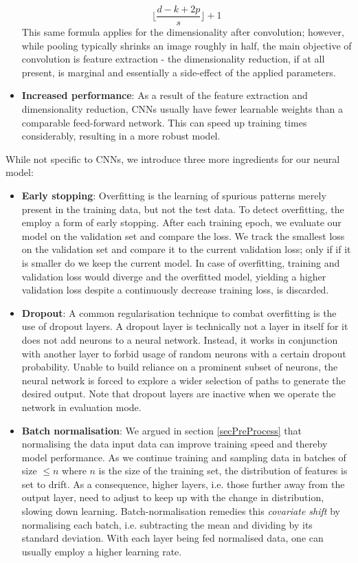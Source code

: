 \documentclass[british,12p]{article}
\begin{document}
\begin{itemize}
    	$$\big\lfloor\frac{d - k + 2p}{s}\big\rfloor + 1$$
    	This same formula applies for the dimensionality after convolution; however, while pooling typically shrinks an image roughly in half, the main objective of convolution is feature extraction - the dimensionality reduction, if at all present, is marginal and essentially a side-effect of the applied parameters. 
    	\item \textbf{Increased performance}: As a result of the feature extraction and dimensionality reduction, CNNs usually have fewer learnable weights than a comparable feed-forward network. This can speed up training times considerably, resulting in a more robust model.
    \end{itemize}
    
    While not specific to CNNs, we introduce three more ingredients for our neural model:
    \begin{itemize}
    	\item \textbf{Early stopping}: Overfitting is the learning of spurious patterns merely present in the training data, but not the test data. To detect overfitting, the employ a form of early stopping. After each training epoch, we evaluate our model on the validation set and compare the loss. We track the smallest loss on the validation set and compare it to the current validation loss; only if if it is smaller do we keep the current model. In case of overfitting, training and validation loss would diverge and the overfitted model, yielding a higher validation loss despite a continuously decrease training loss, is discarded.
        \item \textbf{Dropout}:	A common regularisation technique to combat overfitting is the use of dropout layers. A dropout layer is technically not a layer in itself for it does not add neurons to a neural network. Instead, it works in conjunction with another layer to forbid usage of random neurons with a certain dropout probability. Unable to build reliance on a prominent subset of neurons, the neural network is forced to explore a wider selection of paths to generate the desired output. Note that dropout layers are inactive when we operate the network in evaluation mode. 
    	\item \textbf{Batch normalisation}: We argued in section \ref{secPreProcess} that normalising the data input data can improve training speed and thereby model performance. As we continue training and sampling data in batches of size $\le n$ where $n$ is the size of the training set, the distribution of features is set to drift. As a consequence, higher layers, i.e. those further away from the output layer, need to adjust to keep up with the change in distribution, slowing down learning. Batch-normalisation remedies this \textit{covariate shift} by normalising each batch, i.e. subtracting the mean and dividing by its standard deviation. With each layer being fed normalised data, one can usually employ a higher learning rate. 
    \end{itemize}
    
\end{document}
